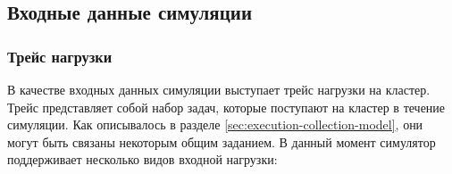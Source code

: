 \subsection{Входные данные симуляции}

\subsubsection{Трейс нагрузки}\label{sec:input-format-trace}

В качестве входных данных симуляции выступает трейс нагрузки на кластер. Трейс представляет собой набор задач, которые поступают на кластер в течение симуляции. Как описывалось в разделе \ref{sec:execution-collection-model}, они могут быть связаны некоторым общим заданием. В данный момент симулятор поддерживает несколько видов входной нагрузки: 

